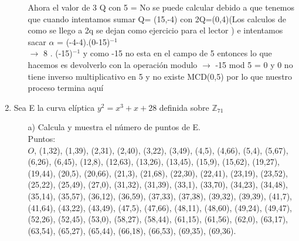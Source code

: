 \documentclass[11pt,letterpaper]{article}
\begin{document}
\begin{enumerate}
\begin{itemize}
Ahora el valor de 3 Q con 5 =  No se puede calcular debido a que tenemos que cuando intentamos sumar Q= (15,-4) con 2Q=(0,4)(Los calculos de como se llego a 2q  se dejan como ejercicio para el lector ) e intentamos sacar $\alpha$ = (-4-4).(0-15)$^{-1}$\\
$\rightarrow$ 8 . (-15)$^{-1}$ y como -15 no esta en el campo de 5 entonces lo que hacemos es devolverlo con la operación modulo $\rightarrow$ -15 mod 5 = 0 y 0 no tiene inverso multiplicativo en 5 y no existe MCD(0,5) por lo que nuestro proceso termina aquí

\end{itemize}
\item Sea E la curva elíptica $y^{2} =x^{3}+x+28 $ definida sobre $\mathbb{Z}_{71}$
\begin{itemize}
\item[a)] Calcula y muestra el número de puntos de E.\\
Puntos:\\ $O$, (1,32),
(1,39),
(2,31),
(2,40),
(3,22),
(3,49),
(4,5),
(4,66),
(5,4),
(5,67),
(6,26),
(6,45),
(12,8),
(12,63),
(13,26),
(13,45),
(15,9),
(15,62),
(19,27),
(19,44),
(20,5),
(20,66),
(21,3),
(21,68),
(22,30),
(22,41),
(23,19),
(23,52),
(25,22),
(25,49),
(27,0),
(31,32),
(31,39),
(33,1),
(33,70),
(34,23),
(34,48),
(35,14),
(35,57),
(36,12),
(36,59),
(37,33),
(37,38),
(39,32),
(39,39),
(41,7),
(41,64),
(43,22),
(43,49),
(47,5),
(47,66),
(48,11),
(48,60),
(49,24),
(49,47),
(52,26),
(52,45),
(53,0),
(58,27),
(58,44),
(61,15),
(61,56),
(62,0),
(63,17),
(63,54),
(65,27),
(65,44),
(66,18),
(66,53),
(69,35),
(69,36).


\end{itemize}
\end{enumerate}
\end{document}
